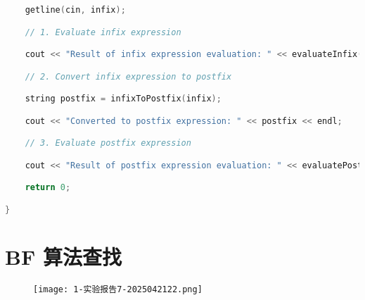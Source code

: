 \begin{lstlisting}[language=C++]
    getline(cin, infix);

    // 1. Evaluate infix expression

    cout << "Result of infix expression evaluation: " << evaluateInfix(infix) << endl;

    // 2. Convert infix expression to postfix

    string postfix = infixToPostfix(infix);

    cout << "Converted to postfix expression: " << postfix << endl;

    // 3. Evaluate postfix expression

    cout << "Result of postfix expression evaluation: " << evaluatePostfix(postfix) << endl;

    return 0;

}
\end{lstlisting}
\section{BF 算法查找}

\begin{figure}[H]
\centering
\texttt{[image: 1-实验报告7-2025042122.png]}
\label{}
\end{figure}

